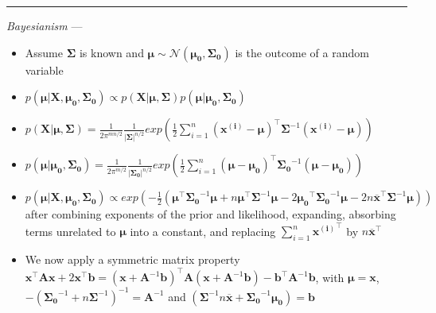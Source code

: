{\color{lightgray}\hrule height 0.001mm}

\emph{Bayesianism} --- 
\begin{itemize}
    \item Assume $\boldsymbol{\Sigma}$ is known and $\boldsymbol{\mu} \sim \mathcal{N}(\boldsymbol{\mu_0}, \boldsymbol{\Sigma_0})$ is the outcome of a random variable
    \item $p(\boldsymbol{\mu} | \boldsymbol{X}, \boldsymbol{\mu_0}, \boldsymbol{\Sigma_0}) \propto p(\boldsymbol{X} | \boldsymbol{\mu}, \boldsymbol{\Sigma})p(\boldsymbol{\mu} | \boldsymbol{\mu_0}, \boldsymbol{\Sigma_0})$
    \item $p(\boldsymbol{X} | \boldsymbol{\mu}, \boldsymbol{\Sigma}) = \frac{1}{2\pi^{mn/2}} \frac{1}{|\boldsymbol{\Sigma}|^{n/2}} exp(\frac{1}{2} \sum_{i=1}^n ( \boldsymbol{\boldsymbol{x^{(i)}}} - \boldsymbol{\mu} )^\intercal \boldsymbol{\Sigma}^{-1} ( \boldsymbol{\boldsymbol{x^{(i)}}} - \boldsymbol{\mu} ) )$
    \item $p(\boldsymbol{\mu} | \boldsymbol{\mu_0}, \boldsymbol{\Sigma_0}) = \frac{1}{2\pi^{m/2}} \frac{1}{|\boldsymbol{\Sigma_0}|^{n/2}} exp(\frac{1}{2} \sum_{i=1}^n ( \boldsymbol{\mu} - \boldsymbol{\mu_0} )^\intercal \boldsymbol{\Sigma_0}^{-1} ( \boldsymbol{\mu} - \boldsymbol{\mu_0} ) )$
    \item $p(\boldsymbol{\mu} | \boldsymbol{X}, \boldsymbol{\mu_0}, \boldsymbol{\Sigma_0}) \propto exp( -\frac{1}{2} ( \boldsymbol{\mu}^\intercal \boldsymbol{\Sigma_0}^{-1} \boldsymbol{\mu} + n \boldsymbol{\mu}^\intercal \boldsymbol{\Sigma}^{-1} \boldsymbol{\mu} - 2 \boldsymbol{\mu_0}^\intercal \boldsymbol{\Sigma_0}^{-1} \boldsymbol{\mu} - 2 n \overline{\boldsymbol{x}}^\intercal \boldsymbol{\Sigma}^{-1} \boldsymbol{\mu} ) )$ after combining exponents of the prior and likelihood, expanding, absorbing terms unrelated to $\boldsymbol{\mu}$ into a constant, and replacing $\sum_{i=1}^n {\boldsymbol{x^{(i)}}}^\intercal$ by $n \overline{\boldsymbol{x}}^\intercal$
    \item We now apply a symmetric matrix property $\boldsymbol{x}^\intercal \boldsymbol{A} \boldsymbol{x} + 2 \boldsymbol{x}^\intercal \boldsymbol{b} = ( \boldsymbol{x} + \boldsymbol{A}^{-1} \boldsymbol{b} )^\intercal \boldsymbol{A} ( \boldsymbol{x} + \boldsymbol{A}^{-1} \boldsymbol{b} ) - \boldsymbol{b}^\intercal \boldsymbol{A}^{-1} \boldsymbol{b}$, with $\boldsymbol{\mu} = \boldsymbol{x}$, $-( \boldsymbol{\Sigma_0}^{-1} + n \boldsymbol{\Sigma}^{-1} )^{-1} = \boldsymbol{A}^{-1}$ and $(\boldsymbol{\Sigma}^{-1} n \overline{\boldsymbol{x}} + \boldsymbol{\Sigma_0}^{-1} \boldsymbol{\mu_0}) = \boldsymbol{b}$

\end{itemize}
